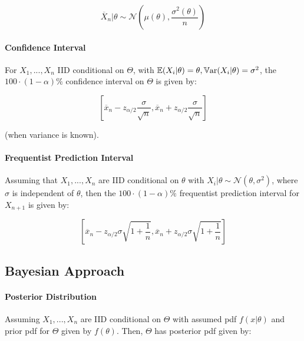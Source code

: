 \documentclass[a4paper]{article}
\begin{document}
                \[
                    \overline X_n | \theta \sim \mathcal{N}\left(\mu(\theta),
                    \frac{\sigma^2(\theta)}{n}\right)
                \]

            \paragraph{Confidence Interval}
                For $X_1, ..., X_n$ IID conditional on $\Theta$, with $\mathbb{E}(X_i |
                \theta) = \theta, \mathbb{V}\text{ar}(X_i | \theta) = \sigma^2$, the $100 \cdot
                (1 - \alpha)\%$ confidence interval on $\Theta$ is given by:

                \[
                    \left[\overline x_n - z_{\alpha/2}\frac{\sigma}{\sqrt{n}},
                    \overline x_n + z_{\alpha/2} \frac{\sigma}{\sqrt{n}}\right]
                \]

                (when variance is known).

            \paragraph{Frequentist Prediction Interval}
                Assuming that $X_1, ..., X_n$ are IID conditional on $\theta$
                with $X_i | \theta \sim \mathcal{N}(\theta, \sigma^2)$, where
                $\sigma$ is independent of $\theta$, then the $100 \cdot (1 -
                \alpha)\%$ frequentist prediction interval for $X_{n+1}$ is
                given by:

                \[
                    \left[\overline x_n - z_{\alpha/2} \sigma \sqrt{1 +
                    \frac{1}{n}}, \overline x_n + z_{\alpha/2} \sigma \sqrt{1 +
                    \frac{1}{n}}\right]
                \]

        \subsection*{Bayesian Approach}
            \paragraph{Posterior Distribution}
                Assuming $X_1, ..., X_n$ are IID conditional on $\Theta$ with
                assumed pdf $f(x | \theta)$ and prior pdf for $\Theta$ given by
                $f(\theta)$. Then, $\Theta$ has posterior pdf given by:
\end{document}
